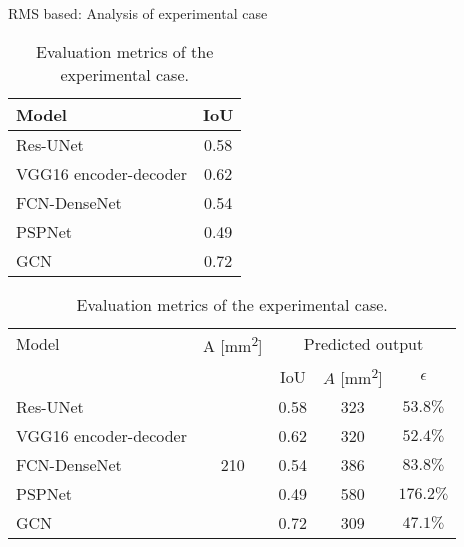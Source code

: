 \documentclass[10pt,aspectratio=169,dvipsnames]{beamer} %
\begin{document}
	\begin{frame}{RMS based: Analysis of experimental case}
				\begin{table}[!ht]
					\centering
					\caption{Evaluation metrics of the experimental case.}
					\label{tab:rms_exp_case__}
					\begin{tabular}{lc}
						\toprule[1.5pt]
						Model & IoU  	\\			
						\midrule
						Res-UNet & 0.58 \\ 
						VGG16 encoder-decoder & 0.62 \\ 
						FCN-DenseNet & 0.54 \\ 
						PSPNet & 0.49 \\ 
						GCN & 0.72\\ 
						\bottomrule[1.5pt]
					\end{tabular}		
				\end{table}
		\begin{table}[!ht]
			\centering
			\caption{Evaluation metrics of the experimental case.}
			\label{tab:rms_exp_case_}
			\begin{tabular}{l@{\ }cccc}
				\toprule
				\multicolumn{1}{l}{Model} & \multicolumn{1}{c}{A [mm\textsuperscript{2}]} & \multicolumn{3}{c}{Predicted output} \\ 
				\cmidrule(lr){3-5} & & \multicolumn{1}{c}{IoU} & \multicolumn{1}{c}{\(\hat{A}\) [mm\textsuperscript{2}]} & \(\epsilon\) \\ \midrule
				Res-UNet & \multicolumn{1}{c}{\multirow{5}{*}{210}} & \multicolumn{1}{c}{0.58} & \multicolumn{1}{c}{323}  & \(53.8\%\) \\ 
				VGG16 encoder-decoder &  & \multicolumn{1}{c}{0.62} & \multicolumn{1}{c}{320} & \(52.4\%\) 
				\\ 
				FCN-DenseNet &  & \multicolumn{1}{c}{0.54} & \multicolumn{1}{c}{386} & \(83.8\%\) \\ 
				PSPNet &  & \multicolumn{1}{c}{0.49} & \multicolumn{1}{c}{580} & \(176.2\%\) 
				\\ 
				GCN &  & \multicolumn{1}{c}{0.72} & \multicolumn{1}{c}{309} & \(47.1\%\) 
				\\ 
				\bottomrule
			\end{tabular}		
		\end{table}
	\end{frame}
	\setcounter{subfigure}{0}
\end{document}
